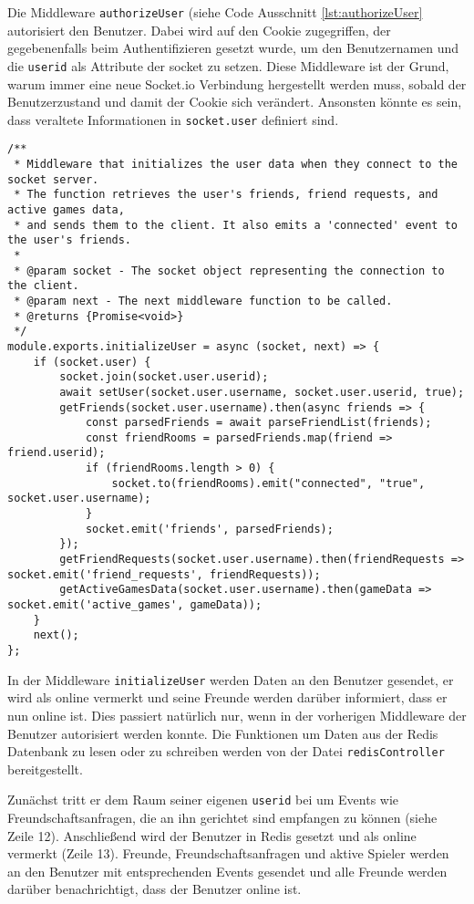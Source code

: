 Die Middleware \verb|authorizeUser| (siehe Code Ausschnitt \ref{lst:authorizeUser} autorisiert den Benutzer. Dabei  wird auf den Cookie zugegriffen, der gegebenenfalls beim Authentifizieren gesetzt wurde, um den Benutzernamen und die \verb|userid| als Attribute der socket zu setzen. Diese Middleware ist der Grund, warum immer eine neue Socket.io Verbindung hergestellt werden muss, sobald der Benutzerzustand und damit der Cookie sich verändert. Ansonsten könnte es sein, dass veraltete Informationen in \verb|socket.user| definiert sind.

\begin{lstlisting}[style=codeStyle, caption={initializeUser Middleware für Socket.io Verbinudngen}, label={lst:initializeUser}]
/**
 * Middleware that initializes the user data when they connect to the socket server.
 * The function retrieves the user's friends, friend requests, and active games data,
 * and sends them to the client. It also emits a 'connected' event to the user's friends.
 *
 * @param socket - The socket object representing the connection to the client.
 * @param next - The next middleware function to be called.
 * @returns {Promise<void>}
 */
module.exports.initializeUser = async (socket, next) => {
    if (socket.user) {
        socket.join(socket.user.userid);
        await setUser(socket.user.username, socket.user.userid, true);
        getFriends(socket.user.username).then(async friends => {
            const parsedFriends = await parseFriendList(friends);
            const friendRooms = parsedFriends.map(friend => friend.userid);
            if (friendRooms.length > 0) {
                socket.to(friendRooms).emit("connected", "true", socket.user.username);
            }
            socket.emit('friends', parsedFriends);
        });
        getFriendRequests(socket.user.username).then(friendRequests => socket.emit('friend_requests', friendRequests));
        getActiveGamesData(socket.user.username).then(gameData => socket.emit('active_games', gameData));
    }
    next();
};
\end{lstlisting}

In der Middleware \verb|initializeUser| werden Daten an den Benutzer gesendet, er wird als online vermerkt und seine Freunde werden darüber informiert, dass er nun online ist. Dies passiert natürlich nur, wenn in der vorherigen Middleware der Benutzer autorisiert werden konnte. Die Funktionen um Daten aus der Redis Datenbank zu lesen oder zu schreiben werden von der Datei \verb|redisController| bereitgestellt.

Zunächst tritt er dem Raum seiner eigenen \verb|userid| bei um Events wie Freundschaftsanfragen, die an ihn gerichtet sind empfangen zu können (siehe Zeile 12). Anschließend wird der Benutzer in Redis gesetzt und als online vermerkt (Zeile 13). Freunde, Freundschaftsanfragen und aktive Spieler werden an den Benutzer mit entsprechenden Events gesendet und alle Freunde werden darüber benachrichtigt, dass der Benutzer online ist.

